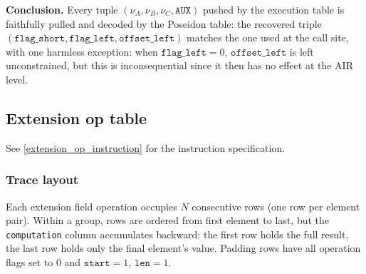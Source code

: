 \documentclass{article}
\theoremstyle{definition}
\begin{document}
\textbf{Conclusion.} Every tuple $(\nu_A, \nu_B, \nu_C, \texttt{AUX})$ pushed by the execution table is faithfully pulled and decoded by the Poseidon table: the recovered triple $(\texttt{flag\_short}, \texttt{flag\_left}, \texttt{offset\_left})$ matches the one used at the call site, with one harmless exception: when $\texttt{flag\_left} = 0$, $\texttt{offset\_left}$ is left unconstrained, but this is inconsequential since it then has no effect at the AIR level.

\subsection{Extension op table}

See \ref{extension_op_instruction} for the instruction specification.

\subsubsection{Trace layout}

Each extension field operation occupies $N$ consecutive rows (one row per element pair). Within a group, rows are ordered from first element to last, but the \texttt{computation} column accumulates backward: the first row holds the full result, the last row holds only the final element's value. Padding rows have all operation flags set to 0 and $\texttt{start} = 1$, $\texttt{len} = 1$.

\vspace{3mm}
\end{document}
